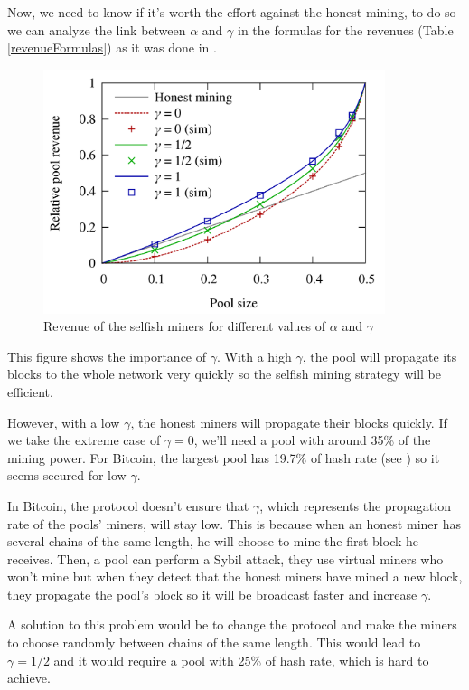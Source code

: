 Now, we need to know if it's worth the effort against the honest mining, to do so we can analyze the link between $\alpha$ and $\gamma$ in the formulas for the revenues (Table \ref{revenueFormulas}) as it was done in \cite{majority_not_enough}. \newline

\begin{figure}[ht]
\centering
\includegraphics[width=10cm]{Figures/poolRevenue}
\caption{Revenue of the selfish miners for different values of $\alpha$ and $\gamma$}
\end{figure}
\medskip

This figure shows the importance of $\gamma$. With a high $\gamma$, the pool will propagate its blocks to the whole network very quickly so the selfish mining strategy will be efficient.

However, with a low $\gamma$, the honest miners will propagate their blocks quickly. If we take the extreme case of $\gamma = 0$, we'll need a pool with around 35\% of the mining power. For Bitcoin, the largest pool has 19.7\% of hash rate (see \cite{hashrate_pools}) so it seems secured for low $\gamma$.\newline

In Bitcoin, the protocol doesn't ensure that $\gamma$, which represents the propagation rate of the pools' miners, will stay low. This is because when an honest miner has several chains of the same length, he will choose to mine the first block he receives. Then, a pool can perform a Sybil attack, they use virtual miners who won't mine but when they detect that the honest miners have mined a new block, they propagate the pool's block so it will be broadcast faster and increase $\gamma$. \newline

A solution to this problem would be to change the protocol and make the miners to choose randomly between chains of the same length. This would lead to $\gamma = 1/2$ and it would require a pool with 25\% of hash rate, which is hard to achieve.
